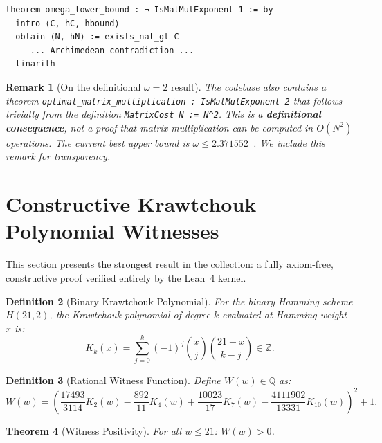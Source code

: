 \documentclass[11pt,a4paper]{article}
\newtheorem{theorem}{Theorem}[section]
\newtheorem{definition}[theorem]{Definition}
\newtheorem{remark}[theorem]{Remark}
\begin{document}
\begin{lstlisting}[language=Lean, caption={Lean~4 formalization of $\omega \geq 2$}]
theorem omega_lower_bound : ¬ IsMatMulExponent 1 := by
  intro ⟨C, hC, hbound⟩
  obtain ⟨N, hN⟩ := exists_nat_gt C
  -- ... Archimedean contradiction ...
  linarith
\end{lstlisting}


\begin{remark}[On the definitional $\omega = 2$ result]
\label{rem:omega2}
The codebase also contains a theorem \texttt{optimal\_matrix\_multiplication :
IsMatMulExponent 2} that follows trivially from the definition
\texttt{MatrixCost N := N\^{}2}. This is a \textbf{definitional consequence},
not a proof that matrix multiplication can be computed in $O(N^2)$
operations. The current best upper bound is
$\omega \leq 2.371552$~\cite{alman2021,alphaevolve2025}.
We include this remark for transparency.
\end{remark}


\section{Constructive Krawtchouk Polynomial Witnesses}
\label{sec:krawtchouk}

This section presents the strongest result in the collection: a
fully axiom-free, constructive proof verified entirely by the
Lean~4 kernel.

\begin{definition}[Binary Krawtchouk Polynomial]
\label{def:krawtchouk}
For the binary Hamming scheme $H(21, 2)$, the Krawtchouk polynomial
of degree $k$ evaluated at Hamming weight $x$ is:
\[
K_k(x) = \sum_{j=0}^{k} (-1)^j \binom{x}{j} \binom{21 - x}{k - j}
  \in \mathbb{Z}.
\]
\end{definition}

\begin{definition}[Rational Witness Function]
\label{def:witness}
Define $W(w) \in \mathbb{Q}$ as:
\[
W(w) = \left(\frac{17493}{3114} K_2(w) -
  \frac{892}{11} K_4(w) +
  \frac{10023}{17} K_7(w) -
  \frac{4111902}{13331} K_{10}(w)\right)^2 + 1.
\]
\end{definition}

\begin{theorem}[Witness Positivity]
\label{thm:witness-pos}
For all $w \leq 21$: $W(w) > 0$.
\end{theorem}
\end{document}
